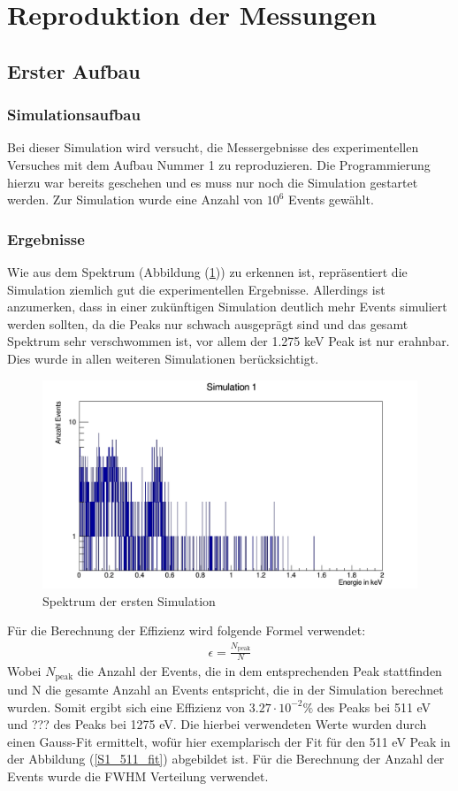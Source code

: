 \documentclass[a4paper,11pt,twoside]{article}
\begin{document}
\section{Reproduktion der Messungen}
	\subsection{Erster Aufbau}
		\subsubsection{Simulationsaufbau}
		Bei dieser Simulation wird versucht, die Messergebnisse des experimentellen Versuches mit dem Aufbau Nummer 1 zu reproduzieren. Die Programmierung hierzu war bereits geschehen und es muss nur noch die Simulation gestartet werden. Zur Simulation wurde eine Anzahl von $10^6$ Events gewählt. 
		
		
		\subsubsection{Ergebnisse}
		Wie aus dem Spektrum (Abbildung (\ref{S1_ganz})) zu erkennen ist, repräsentiert die Simulation ziemlich gut die experimentellen Ergebnisse. Allerdings ist anzumerken, dass in einer zukünftigen Simulation deutlich mehr Events simuliert werden sollten, da die Peaks nur schwach ausgeprägt sind und das gesamt Spektrum sehr verschwommen ist, vor allem der 1.275 keV Peak ist nur erahnbar. Dies wurde in allen weiteren Simulationen berücksichtigt. 
		
		 
\begin{figure}[H]
	\begin{center}
		\includegraphics[width=0.7\linewidth]{Simulation1_ganz}
		\caption{Spektrum der ersten Simulation}
		\label{S1_ganz}
	\end{center}
\end{figure}	

Für die Berechnung der Effizienz wird folgende Formel verwendet:
\begin{align}
	\epsilon = \frac{N_{\textrm{peak}}}{N}
\end{align}
Wobei $N_\textrm{peak}$ die Anzahl der Events, die in dem entsprechenden Peak stattfinden und N die gesamte Anzahl an Events entspricht, die in der Simulation berechnet wurden. Somit ergibt sich eine Effizienz von $3.27\cdot 10^{-2}\%$ des Peaks bei 511 eV und {\color{Red}???} des Peaks bei 1275 eV. Die hierbei verwendeten Werte wurden durch einen Gauss-Fit ermittelt, wofür hier exemplarisch der Fit für den 511 eV Peak in der Abbildung (\ref{S1_511_fit}) abgebildet ist. Für die Berechnung der Anzahl der Events wurde die FWHM Verteilung verwendet.   
		
\end{document}
